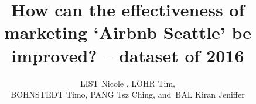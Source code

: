 %
%




\documentclass[journal]{IEEEtran}

\usepackage{xcolor,soul,framed} %

\usepackage[pdftex]{graphicx}
\graphicspath{{../pdf/}{../jpeg/}}

\usepackage[cmex10]{amsmath}
\usepackage{array}
\usepackage{mdwmath}
\usepackage{mdwtab}
\usepackage{eqparbox}
\usepackage{url}



    \title{How can the effectiveness of marketing ‘Airbnb Seattle’ be improved?
– dataset of 2016 
}
  \author{LIST Nicole ,
      L\"OHR Tim,\\
      BOHNSTEDT Timo,
      PANG Tsz Ching,
      and~BAL Kiran Jeniffer%
      
     
}


